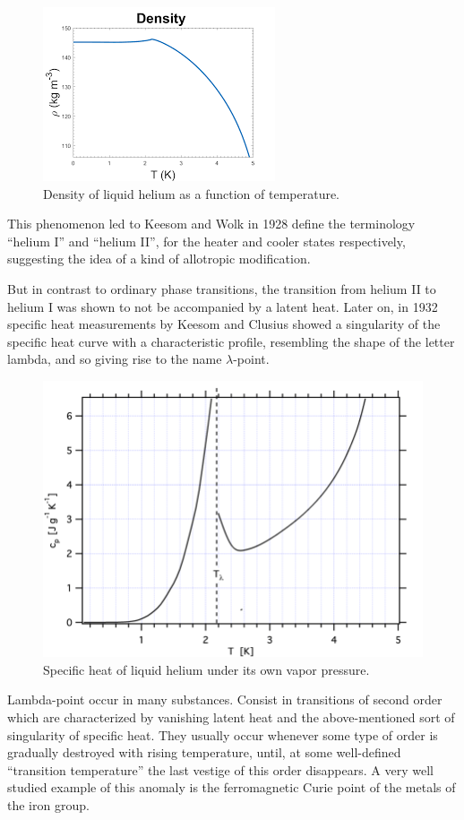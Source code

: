\documentclass{article}
\begin{document}
\begin{figure}[H]
    \centering
    \includegraphics[width=0.62\linewidth]{Images/Density.png}
    \caption{Density of liquid helium as a function of temperature.}
    \label{fig:enter-label}
\end{figure}

This phenomenon led to Keesom and Wolk in 1928 define the terminology ``helium I'' and ``helium II'',
for the heater and cooler states respectively,
suggesting the idea of a kind of allotropic modification.

But in contrast to ordinary phase transitions, the transition from helium II to helium I was shown to not be accompanied by a latent heat. Later on, in 1932 specific heat measurements by Keesom and Clusius showed a singularity of the specific heat curve with a characteristic profile, resembling the shape of the letter lambda, and so giving rise to the name $\lambda$-point.
\\
\begin{figure}[H]
    \centering
    \includegraphics[width=0.62\linewidth]{Images/LambdaCp.png}
    \caption{Specific heat of liquid helium under its own vapor pressure.}
    \label{fig:enter-label}
\end{figure}

Lambda-point occur in many substances. Consist in transitions of second order which are characterized by vanishing latent heat and the above-mentioned sort of singularity of specific heat. They usually occur whenever some type of order is gradually destroyed with rising temperature, until, at some well-defined ``transition temperature'' the last vestige of this order disappears. A very well studied example of this anomaly is the ferromagnetic Curie point of the metals of the iron group.
\\
\end{document}

